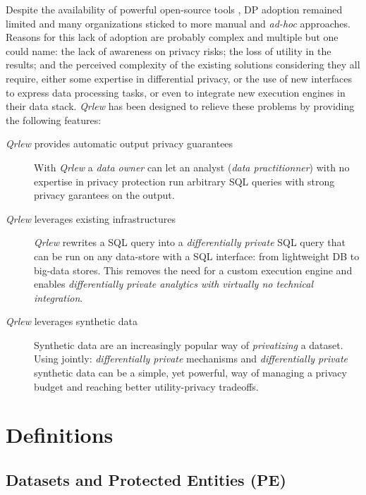 \documentclass[letterpaper]{article} %
\newcommand{\qrlew}{\emph{Qrlew}}
\begin{document}
Despite the availability of powerful open-source tools \cite{kotsogiannis2019privatesql, diffprivlib, OpenDP, PipelineDP, ZetaSQL, PrivacyOnBeam, johnson2020chorus, berghel2022tumult, yousefpour2021opacus}, DP adoption remained limited and many organizations sticked to more manual and \emph{ad-hoc} approaches.
Reasons for this lack of adoption are probably complex and multiple but one could name: the lack of awareness on privacy risks; the loss of utility in the results; and the perceived complexity of the existing solutions considering they all require, either some expertise in differential privacy, or the use of new interfaces to express data processing tasks, or even to integrate new execution engines in their data stack.
\qrlew{} \cite{Grislain_Qrlew_2023} has been designed to relieve these problems by providing the following features:
\begin{description}
    \item[\qrlew{} provides automatic output privacy guarantees]
    With \qrlew{} a \emph{data owner} can let an analyst (\emph{data practitionner}) with no expertise in privacy protection run arbitrary SQL queries with strong privacy garantees on the output.
    \item[\qrlew{} leverages existing infrastructures]
    \qrlew{} rewrites a SQL query into a \emph{differentially private} SQL query that can be run on any data-store with a SQL interface: from lightweight DB to big-data stores.
This removes the need for a custom execution engine and enables \emph{differentially private analytics with virtually no technical integration}.
    \item[\qrlew{} leverages synthetic data]
    Synthetic data are an increasingly popular way of \emph{privatizing} a dataset. Using jointly: \emph{differentially private} mechanisms and \emph{differentially private} synthetic data can be a simple, yet powerful, way of managing a privacy budget and reaching better utility-privacy tradeoffs.
\end{description}


\section{Definitions}

\subsection*{Datasets and Protected Entities (PE)}
\end{document}
